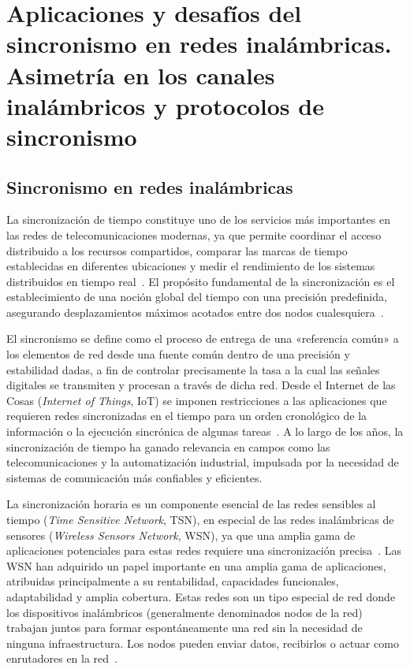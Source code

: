 
\chapter{Aplicaciones y desafíos del sincronismo en redes inalámbricas. Asimetría en los canales inalámbricos y protocolos de sincronismo}
\label{ch:capitulo1}

\section{Sincronismo en redes inalámbricas}
\label{sec:1.1}

La sincronización de tiempo constituye uno de los servicios más importantes en las redes de telecomunicaciones modernas, ya que permite coordinar el acceso distribuido a los recursos compartidos, comparar las marcas de tiempo establecidas en diferentes ubicaciones y medir el rendimiento de los sistemas distribuidos en tiempo real~\cite{balakrishnan2023}. El propósito fundamental de la sincronización es el establecimiento de una noción global del tiempo con una precisión predefinida, asegurando desplazamientos máximos acotados entre dos nodos cualesquiera~\cite{baniabdelghany2020}.

El sincronismo se define como el proceso de entrega de una «referencia común» a los elementos de red desde una fuente común dentro de una precisión y estabilidad dadas, a fin de controlar precisamente la tasa a la cual las señales digitales se transmiten y procesan a través de dicha red. Desde el Internet de las Cosas (\textit{Internet of Things}, IoT) se imponen restricciones a las aplicaciones que requieren redes sincronizadas en el tiempo para un orden cronológico de la información o la ejecución sincrónica de algunas tareas~\cite{duran2020}. A lo largo de los años, la sincronización de tiempo ha ganado relevancia en campos como las telecomunicaciones y la automatización industrial, impulsada por la necesidad de sistemas de comunicación más confiables y eficientes.

La sincronización horaria es un componente esencial de las redes sensibles al tiempo (\textit{Time Sensitive Network}, TSN), en especial de las redes inalámbricas de sensores (\textit{Wireless Sensors Network}, WSN), ya que una amplia gama de aplicaciones potenciales para estas redes requiere una sincronización precisa~\cite{swain2015,barooah2007}. Las WSN han adquirido un papel importante en una amplia gama de aplicaciones, atribuidas principalmente a su rentabilidad, capacidades funcionales, adaptabilidad y amplia cobertura. Estas redes son un tipo especial de red donde los dispositivos inalámbricos (generalmente denominados nodos de la red) trabajan juntos para formar espontáneamente una red sin la necesidad de ninguna infraestructura. Los nodos pueden enviar datos, recibirlos o actuar como enrutadores en la red~\cite{lasassmeh2010}.

